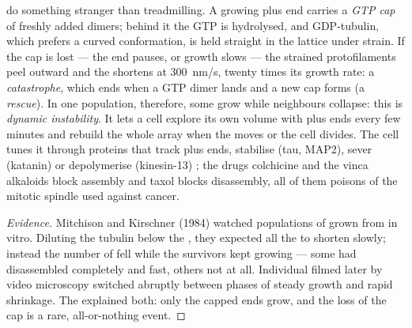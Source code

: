 \begin{definition}\label{def:b3:cytoskeleton-motility:instability}
 do something stranger than treadmilling. A growing plus
end carries a \emph{GTP cap} of freshly added dimers; behind it the GTP
is hydrolysed, and GDP-tubulin, which prefers a curved conformation,
is held straight in the lattice under strain. If the cap is lost --- the
end pauses, or growth slows --- the strained protofilaments peel
outward and the  shortens at \qty{300}{nm/s}, twenty times
its growth rate: a \emph{catastrophe}, which ends when a GTP dimer
lands and a new cap forms (a \emph{rescue}). In one population,
therefore, some  grow while neighbours collapse: this is
\emph{dynamic instability}. It lets a cell explore its own volume with
plus ends every few minutes and rebuild the whole array when the
 moves or the cell divides. The cell tunes it through
proteins that track plus ends, stabilise (tau, MAP2), sever (katanin)
or depolymerise (kinesin-13) ; the drugs colchicine and
the vinca alkaloids block assembly and taxol blocks disassembly, all
of them poisons of the mitotic spindle used against cancer.
\end{definition}

\begin{proof}[Evidence]
Mitchison and Kirschner (1984) watched populations of 
grown from  in vitro. Diluting the tubulin below the
, they expected all the  to shorten
slowly; instead the number of  fell while the survivors
kept growing --- some had disassembled completely and fast, others not
at all. Individual  filmed later by video microscopy
switched abruptly between phases of steady growth and rapid shrinkage.
The  explained both: only the capped ends grow, and the loss of
the cap is a rare, all-or-nothing event.
\end{proof}

